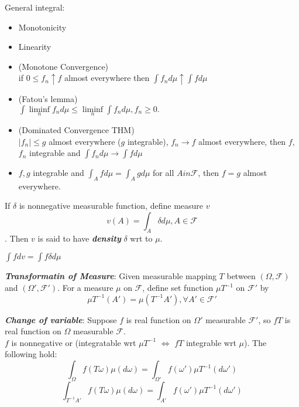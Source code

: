 \documentclass[10pt,twocolumn]{article}
\newenvironment{mydef}[1][Definition]{\begin{trivlist}
\item[\hskip \labelsep {\bfseries #1}]}{\end{trivlist}}
\newenvironment{props}[1][Properties]{\begin{trivlist}
\item[\hskip \labelsep {\bfseries #1}]}{\end{trivlist}}
\newcommand{\bt}[1]{\textbf{\textit{#1}}}
\begin{document}
\begin{props} General integral:
	\begin{itemize}
		\item Monotonicity
		\item Linearity
		\item (Monotone Convergence) \\  if $ 0 \leq f_n \uparrow f$ almost everywhere then $\int f_n d\mu \uparrow \int f d\mu$
		\item (Fatou's lemma) \\  $\int \liminf\limits_n f_n d\mu \leq \liminf\limits_n \int f_n d\mu,  f_n\ge 0.$
		\item (Dominated Convergence THM) \\ $|f_n| \leq g$ almost everywhere ($g$ integrable), $f_n \rightarrow f$ almost everywhere,  then $f$, $f_n$ integrable and $\int f_n d\mu \rightarrow \int fd\mu$
		\item $f, g$ integrable and $\int_A fd\mu = \int_A g d\mu$ for all $A in \mathscr{F}$, then $f=g$ almost everywhere.
	\end{itemize}
\end{props}

\begin{mydef}
	If $\delta$ is nonnegative measurable function, define measure $v$ $$ v(A) = \int_A \delta d\mu, A \in \mathscr{F}$$. Then $v$ is said to have \bt{density} $\delta$ wrt to $\mu$.
\end{mydef}

\begin{props}
	$\int f dv = \int f \delta d \mu$
\end{props}

\begin{mydef}
	\bt{Transformatin of Measure}: Given measurable mapping $T$ between $(\Omega, \mathscr{F})$ and $(\Omega', \mathscr{F}')$. For a measure $\mu$ on $\mathscr{F}$, define set function $\mu T^{-1}$ on $\mathscr{F}'$ by  $$\mu T^{-1}(A') = \mu (T^{-1}A'), \forall A' \in \mathscr{F}'$$
\end{mydef}

\begin{mydef}
	\bt{Change of variable}: Suppose $f$ is real function on $\Omega'$ measurable $\mathscr{F}'$, so $fT$ is real function on $\Omega$ measurable $\mathscr{F}$. \\
	$f$ is nonnegative or (integratable wrt $\mu T^{-1}$ $	\Leftrightarrow$  $fT$ integrable wrt $\mu$). The following hold:
	 $$\int_\Omega f(T\omega)\mu (d\omega) = \int_{\Omega'} f(\omega')\mu T^{-1}(d\omega')$$
	 $$\int_{T^{-1}A'} f(T\omega)\mu (d\omega) = \int_{A'} f(\omega')\mu T^{-1}(d\omega')$$
\end{mydef}
\end{document}
